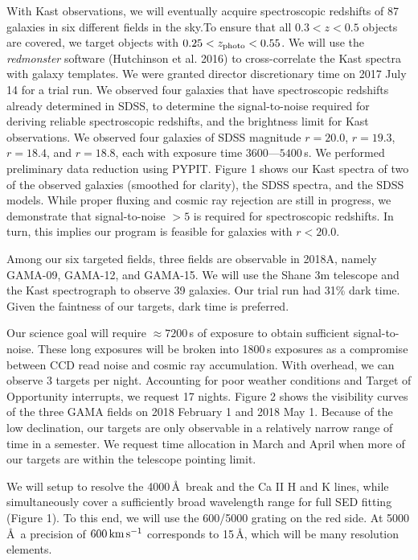 \documentclass[letterpaper,12pt]{article}
\begin{document}
With Kast observations, we will eventually acquire spectroscopic redshifts of 87 galaxies in six different fields in
the sky.To ensure that all $0.3 < z < 0.5$ objects are covered, we target objects with $0.25<z_{\rm photo}<0.55$. We
will use the {\it redmonster} software (Hutchinson et al. 2016) to cross-correlate the Kast spectra with galaxy
templates. We were granted director discretionary time on 2017 July 14 for a trial run. We observed four galaxies that
have spectroscopic redshifts already determined in SDSS, to determine the signal-to-noise required for deriving
reliable spectroscopic redshifts, and the brightness limit for Kast observations. We observed four galaxies of SDSS
magnitude $r=20.0$, $r=19.3$, $r=18.4$, and $r=18.8$, each with exposure time $3600\textrm{---}5400$\,s. We performed
preliminary data reduction using PYPIT. Figure 1 shows our Kast spectra of two of the observed galaxies (smoothed for
clarity), the SDSS spectra, and the SDSS models. While proper fluxing and cosmic ray rejection are still in progress,
we demonstrate that signal-to-noise $>5$ is required for spectroscopic redshifts. In turn, this implies our program is
feasible for galaxies with $r<20.0$.

Among our six targeted fields, three fields are observable in 2018A, namely GAMA-09, GAMA-12, and GAMA-15. We will use
the Shane 3m telescope and the Kast spectrograph to observe 39 galaxies. Our trial run had 31\% dark time. Given the
faintness of our targets, dark time is preferred.

Our science goal will require $\approx7200$\,s of exposure to obtain sufficient signal-to-noise. These long exposures
will be broken into 1800\,s exposures as a compromise between CCD read noise and cosmic ray accumulation. With
overhead, we can observe 3 targets per night. Accounting for poor weather conditions and Target of Opportunity
interrupts, we request 17 nights. Figure 2 shows the visibility curves of the three GAMA fields on 2018 February 1 and
2018 May 1. Because of the low declination, our targets are only observable in a relatively narrow range of time in a
semester. We request time allocation in March and April when more of our targets are within the telescope pointing
limit.

We will setup to resolve the 4000\,\AA\ break and the Ca II H and K lines, while simultaneously cover a sufficiently
broad wavelength range for full SED fitting (Figure 1). To this end, we will use the 600/5000 grating on the red side.
At 5000\,\AA\, a precision of $600\,{\rm km\,s^{-1}}$ corresponds to 15\,\AA, which will be many resolution elements.
\end{document}
